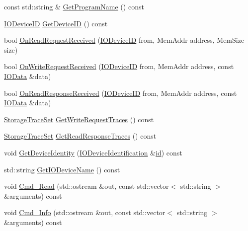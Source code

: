 \begin{DoxyCompactItemize}
\item 
const std\+::string \& \hyperlink{class_simulator_1_1_active_r_o_m_a2fdb18b29b35d8e56d586e67246ad16a}{Get\+Program\+Name} () const 
\item 
\hyperlink{namespace_simulator_a3493d987c866ad6b8aaa704c42502db0}{I\+O\+Device\+I\+D} \hyperlink{class_simulator_1_1_active_r_o_m_ab14b99dfff2e78b8c74cc90f2193b3e4}{Get\+Device\+I\+D} () const 
\item 
bool \hyperlink{class_simulator_1_1_active_r_o_m_ac6e900c295407b982f6678a3745af66c}{On\+Read\+Request\+Received} (\hyperlink{namespace_simulator_a3493d987c866ad6b8aaa704c42502db0}{I\+O\+Device\+I\+D} from, Mem\+Addr address, Mem\+Size size)
\item 
bool \hyperlink{class_simulator_1_1_active_r_o_m_a43f9ab1bae1a8a67d44b97cc806f891b}{On\+Write\+Request\+Received} (\hyperlink{namespace_simulator_a3493d987c866ad6b8aaa704c42502db0}{I\+O\+Device\+I\+D} from, Mem\+Addr address, const \hyperlink{struct_simulator_1_1_i_o_data}{I\+O\+Data} \&data)
\item 
bool \hyperlink{class_simulator_1_1_active_r_o_m_a8630c7aaf85302843d0ff5027d0ada0e}{On\+Read\+Response\+Received} (\hyperlink{namespace_simulator_a3493d987c866ad6b8aaa704c42502db0}{I\+O\+Device\+I\+D} from, Mem\+Addr address, const \hyperlink{struct_simulator_1_1_i_o_data}{I\+O\+Data} \&data)
\item 
\hyperlink{class_simulator_1_1_storage_trace_set}{Storage\+Trace\+Set} \hyperlink{class_simulator_1_1_active_r_o_m_a3504469cf42d652f4f196de9b1eb5ba9}{Get\+Write\+Request\+Traces} () const 
\item 
\hyperlink{class_simulator_1_1_storage_trace_set}{Storage\+Trace\+Set} \hyperlink{class_simulator_1_1_active_r_o_m_a8cdf2fcc5f552d6fec8fa0703b92746d}{Get\+Read\+Response\+Traces} () const 
\item 
void \hyperlink{class_simulator_1_1_active_r_o_m_ae204edea9cb465dcc8967d8a1cc1c411}{Get\+Device\+Identity} (\hyperlink{struct_simulator_1_1_i_o_device_identification}{I\+O\+Device\+Identification} \&\hyperlink{mtconf_8c_aa3185401f04d30bd505daebf48c39cc5}{id}) const 
\item 
std\+::string \hyperlink{class_simulator_1_1_active_r_o_m_a395f9d7d00fffcc56118ca27986ea5f1}{Get\+I\+O\+Device\+Name} () const 
\item 
void \hyperlink{class_simulator_1_1_active_r_o_m_a5259e7a783ed0e61bc914bf83baab573}{Cmd\+\_\+\+Read} (std\+::ostream \&out, const std\+::vector$<$ std\+::string $>$ \&arguments) const 
\item 
void \hyperlink{class_simulator_1_1_active_r_o_m_a1e520c42b85292c8e34b4e8dd3af6fc9}{Cmd\+\_\+\+Info} (std\+::ostream \&out, const std\+::vector$<$ std\+::string $>$ \&arguments) const 
\end{DoxyCompactItemize}
